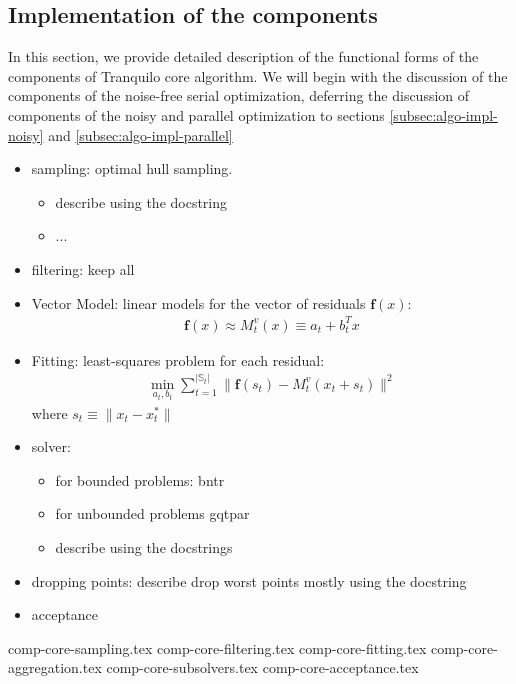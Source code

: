 \subsection{Implementation of the components}
\label{subsec:core-implementation}
In this section, we provide detailed description of the functional forms of the components of Tranquilo core algorithm. We will begin with the discussion of the components of the noise-free serial optimization, deferring the discussion of components of the noisy and parallel optimization to sections \ref{subsec:algo-impl-noisy} and \ref{subsec:algo-impl-parallel}
\begin{itemize}
    \item sampling: optimal hull sampling.
        \begin{itemize}
            \item describe using the docstring
            \item ...
        \end{itemize}
    \item filtering: keep all
    \item Vector Model:  linear models for the vector of residuals $\mathbf{f}(x)$:
    \begin{align}
        \mathbf{f}(x)\approx M^v_{t}(x) \equiv a_t+b_t^Tx
        \label{eq:model-linear}
    \end{align}
    \item Fitting: least-squares problem for each residual:
    \begin{align}
        \min\limits_{a_{t},b_{t}}\sum\limits_{t=1}^{|\mathbb{S}_t|}\lVert\mathbf{f}(s_t)-M_t^v(x_t+s_t)\rVert^2
        \label{eq:fit-linear}
    \end{align}
    where $s_t\equiv\lVert x_t-x_t^*\rVert$
    \item solver:
        \begin{itemize}
            \item for bounded problems: bntr
            \item for unbounded problems gqtpar
            \item describe using the docstrings
        \end{itemize}
    \item  dropping points: describe drop worst points mostly using the docstring
    \item acceptance
\end{itemize}
{comp-core-sampling.tex}
{comp-core-filtering.tex}
{comp-core-fitting.tex}
{comp-core-aggregation.tex}
{comp-core-subsolvers.tex}
{comp-core-acceptance.tex}
